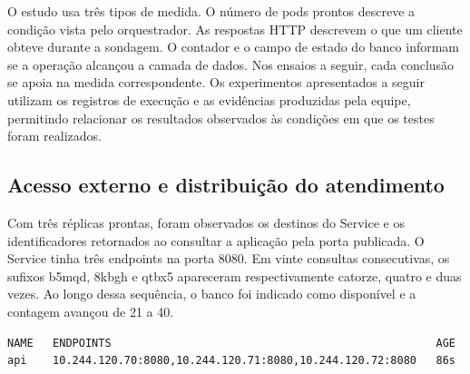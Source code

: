 O estudo usa três tipos de medida. O número de pods prontos descreve a condição vista pelo orquestrador. As respostas HTTP descrevem o que um cliente obteve durante a sondagem. O contador e o campo de estado do banco informam se a operação alcançou a camada de dados. Nos ensaios a seguir, cada conclusão se apoia na medida correspondente. Os experimentos apresentados a seguir utilizam os registros de execução e as evidências produzidas pela equipe, permitindo relacionar os resultados observados às condições em que os testes foram realizados.
\FloatBarrier\subsection{Acesso externo e distribuição do atendimento}
Com três réplicas prontas, foram observados os destinos do Service e os identificadores retornados ao consultar a aplicação pela porta publicada. O Service tinha três endpoints na porta 8080. Em vinte consultas consecutivas, os sufixos b5mqd, 8kbgh e qtbx5 apareceram respectivamente catorze, quatro e duas vezes. Ao longo dessa sequência, o banco foi indicado como disponível e a contagem avançou de 21 a 40.


\par\noindent\begin{minipage}{\linewidth}\begin{lstlisting}
NAME   ENDPOINTS                                                  AGE
api    10.244.120.70:8080,10.244.120.71:8080,10.244.120.72:8080   86s
\end{lstlisting}
\end{minipage}\par

